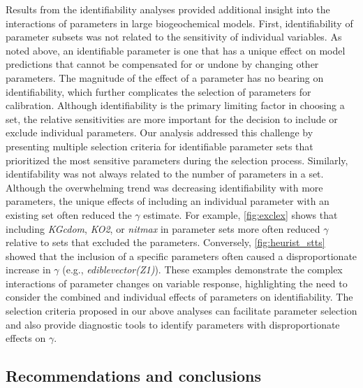 \documentclass[letterpaper,12pt,oneside]{article}\usepackage[]{graphicx}\usepackage[]{color}
\begin{document}
Results from the identifiability analyses provided additional insight into the interactions of parameters in large biogeochemical models.  First, identifiability of parameter subsets was not related to the sensitivity of individual variables. As noted above, an identifiable parameter is one that has a unique effect on model predictions that cannot be compensated for or undone by changing other parameters. The magnitude of the effect of a parameter has no bearing on identifiability, which further complicates the selection of parameters for calibration.  Although identifiability is the primary limiting factor in choosing a set, the relative sensitivities are more important for the decision to include or exclude individual parameters.  Our analysis addressed this challenge by presenting multiple selection criteria for identifiable parameter sets that prioritized the most sensitive parameters during the selection process.  Similarly, identifability was not always related to the number of parameters in a set. Although the overwhelming trend was decreasing identifiability with more parameters, the unique effects of including an individual parameter with an existing set often reduced the $\gamma$ estimate. For example, \cref{fig:exclex} shows that including \textit{KGcdom}, \textit{KO2}, or \textit{nitmax} in parameter sets more often reduced $\gamma$ relative to sets that excluded the parameters.  Conversely, \cref{fig:heurist_stts} showed that the inclusion of a specific parameters often caused a disproportionate increase in $\gamma$ (e.g., \textit{ediblevector(Z1)}). These examples demonstrate the complex interactions of parameter changes on variable response, highlighting the need to consider the combined and individual effects of parameters on identifiability. The selection criteria proposed in our above analyses can facilitate parameter selection and also provide diagnostic tools to identify parameters with disproportionate effects on $\gamma$.

\subsection{Recommendations and conclusions}
\end{document}
